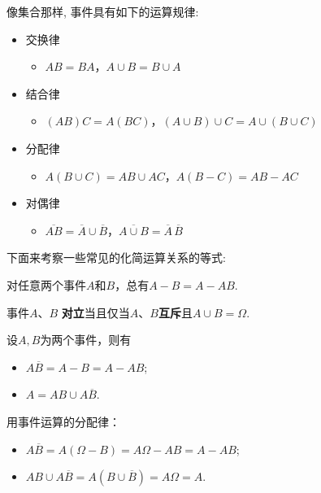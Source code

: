 像集合那样, 事件具有如下的运算规律: 
\begin{itemize}
    \item 交换律
    \begin{itemize}
        \item $AB=BA$，$A\cup B=B\cup A$
    \end{itemize}
    \item 结合律
    \begin{itemize}
        \item $(AB)C=A(BC)$，$(A\cup B)\cup C=A\cup(B\cup C)$
    \end{itemize}
    \item 分配律
    \begin{itemize}
        \item $A(B\cup C)=AB\cup AC$，$A(B-C)=AB-AC$
    \end{itemize}
    \item 对偶律
    \begin{itemize}
        \item $\overline{AB}=\overline{A}\cup\overline{B}$，$\overline{A\cup B}=\overline{A}\,\overline{B}$
    \end{itemize}
\end{itemize}

下面来考察一些常见的化简运算关系的等式: 

\begin{proposition}
        对任意两个事件$A$和$B$，总有$ A-B=A-AB$. 
\end{proposition}

\begin{proposition}
    事件$A$、$B$ \textbf{对立}当且仅当$A$、$B$\textbf{互斥}且$A\cup B=\Omega$. 
\end{proposition}
\begin{example}
    设$A,B$为两个事件，则有
        \begin{itemize}
            \item $A\overline{B}=A-B=A-AB$; 
            \item $A=AB\cup A\overline{B}$. 
        \end{itemize}
\end{example}

\begin{solution}
    用事件运算的分配律：
    \begin{itemize}
        \item $A\overline{B}=A(\Omega-B)=A\Omega-AB=A-AB$; 
        \item $AB\cup A\overline{B}=A(B\cup\overline{B})=A\Omega=A$. 
    \end{itemize}
\end{solution}

